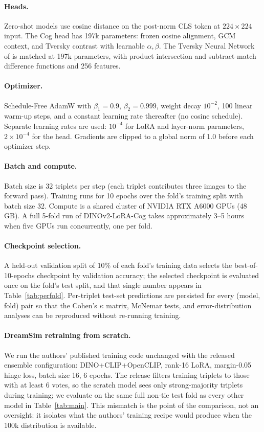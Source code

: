 \paragraph{Heads.} Zero-shot models use cosine distance on the post-norm CLS token at $224\times224$ input. The Cog head has 197k parameters: frozen cosine alignment, GCM context, and Tversky contrast with learnable $\alpha, \beta$. The Tversky Neural Network of \citet{doumbouya2025tversky} is matched at 197k parameters, with product intersection and subtract-match difference functions and 256 features.

\paragraph{Optimizer.} Schedule-Free AdamW \citep{defazio2024schedulefree} with $\beta_1 = 0.9$, $\beta_2 = 0.999$, weight decay $10^{-2}$, 100 linear warm-up steps, and a constant learning rate thereafter (no cosine schedule). Separate learning rates are used: $10^{-4}$ for LoRA and layer-norm parameters, $2\times 10^{-4}$ for the head. Gradients are clipped to a global norm of 1.0 before each optimizer step.

\paragraph{Batch and compute.} Batch size is 32 triplets per step (each triplet contributes three images to the forward pass). Training runs for 10 epochs over the fold's training split with batch size 32. Compute is a shared cluster of NVIDIA RTX A6000 GPUs (48\,GB). A full 5-fold run of DINOv2-LoRA-Cog takes approximately 3--5 hours when five GPUs run concurrently, one per fold.

\paragraph{Checkpoint selection.} A held-out validation split of 10\% of each fold's training data selects the best-of-10-epochs checkpoint by validation accuracy; the selected checkpoint is evaluated once on the fold's test split, and that single number appears in Table~\ref{tab:perfold}. Per-triplet test-set predictions are persisted for every (model, fold) pair so that the Cohen's $\kappa$ matrix, McNemar tests, and error-distribution analyses can be reproduced without re-running training.

\paragraph{DreamSim retraining from scratch.} We run the authors' published training code unchanged with the released ensemble configuration: DINO+CLIP+OpenCLIP, rank-16 LoRA, margin-0.05 hinge loss, batch size 16, 6 epochs. The release filters training triplets to those with at least 6 votes, so the scratch model sees only strong-majority triplets during training; we evaluate on the same full non-tie test fold as every other model in Table~\ref{tab:main}. This mismatch is the point of the comparison, not an oversight: it isolates what the authors' training recipe would produce when the 100k distribution is available.

